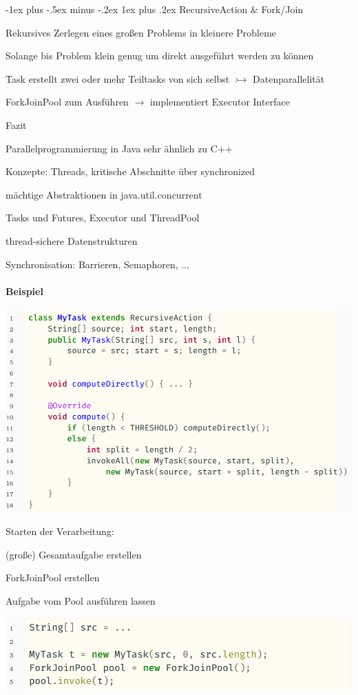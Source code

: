 \documentclass[10pt]{article}
\makeatletter
\renewcommand{\subsubsection}{\@startsection{subsubsection}{3}{0mm}%
                                {-1ex plus -.5ex minus -.2ex}%
                                {1ex plus .2ex}%
                                {\normalfont\small\bfseries}}
\makeatother
\begin{document}
\subsubsection{RecursiveAction \& Fork/Join}
\begin{itemize*}
  \item Rekursives Zerlegen eines großen Problems in kleinere Probleme
  \item Solange bis Problem klein genug um direkt ausgeführt werden zu können
  \item Task erstellt zwei oder mehr Teiltasks von sich selbst $\rightarrowtail$ Datenparallelität
  \item ForkJoinPool zum Ausführen $\rightarrow$ implementiert Executor Interface
  \item Fazit
  \begin{itemize*}
    \item Parallelprogrammierung in Java sehr ähnlich zu C++
    \item Konzepte: Threads, kritische Abschnitte über synchronized
    \item mächtige Abstraktionen in java.util.concurrent
    \begin{itemize*}
      \item Tasks und Futures, Executor und ThreadPool
      \item thread-sichere Datenstrukturen
      \item Synchronisation: Barrieren, Semaphoren, ...
    \end{itemize*}
  \end{itemize*}
\end{itemize*}

\paragraph{Beispiel}

\begin{center}
  \includegraphics[width=0.4\linewidth]{Assets/Programmierparadigmen-code-snippet-55}
\end{center}
Starten der Verarbeitung: 
\begin{enumerate*}
  \item (große) Gesamtaufgabe erstellen
  \item ForkJoinPool erstellen
  \item Aufgabe vom Pool ausführen lassen
\end{enumerate*}
\begin{center}
  \includegraphics[width=0.4\linewidth]{Assets/Programmierparadigmen-code-snippet-56}
\end{center}
\end{document}
